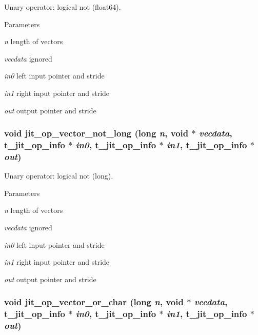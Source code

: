 Unary operator: logical not (float64). 
\begin{DoxyParams}{Parameters}
\item[{\em n}]length of vectors \item[{\em vecdata}]ignored \item[{\em in0}]left input pointer and stride \item[{\em in1}]right input pointer and stride \item[{\em out}]output pointer and stride \end{DoxyParams}
\hypertarget{group__opvecmod_gaa584a1fe47a2f462540d65b00e3db0aa}{
\subsubsection[{jit\_\-op\_\-vector\_\-not\_\-long}]{\setlength{\rightskip}{0pt plus 5cm}void jit\_\-op\_\-vector\_\-not\_\-long (long {\em n}, \/  void $\ast$ {\em vecdata}, \/  {\bf t\_\-jit\_\-op\_\-info} $\ast$ {\em in0}, \/  {\bf t\_\-jit\_\-op\_\-info} $\ast$ {\em in1}, \/  {\bf t\_\-jit\_\-op\_\-info} $\ast$ {\em out})}}
\label{group__opvecmod_gaa584a1fe47a2f462540d65b00e3db0aa}


Unary operator: logical not (long). 
\begin{DoxyParams}{Parameters}
\item[{\em n}]length of vectors \item[{\em vecdata}]ignored \item[{\em in0}]left input pointer and stride \item[{\em in1}]right input pointer and stride \item[{\em out}]output pointer and stride \end{DoxyParams}
\hypertarget{group__opvecmod_ga5574fb7eb3d8abcc20dbc1db15b0e68b}{
\subsubsection[{jit\_\-op\_\-vector\_\-or\_\-char}]{\setlength{\rightskip}{0pt plus 5cm}void jit\_\-op\_\-vector\_\-or\_\-char (long {\em n}, \/  void $\ast$ {\em vecdata}, \/  {\bf t\_\-jit\_\-op\_\-info} $\ast$ {\em in0}, \/  {\bf t\_\-jit\_\-op\_\-info} $\ast$ {\em in1}, \/  {\bf t\_\-jit\_\-op\_\-info} $\ast$ {\em out})}}
\label{group__opvecmod_ga5574fb7eb3d8abcc20dbc1db15b0e68b}


